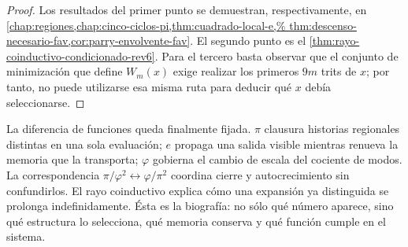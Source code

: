 \begin{proof}
Los resultados del primer punto se demuestran, respectivamente, en
\cref{chap:regiones,chap:cinco-ciclos-pi,thm:cuadrado-local-e,%
thm:descenso-necesario-fav,cor:parry-envolvente-fav}. El segundo punto es
el \cref{thm:rayo-coinductivo-condicionado-rev6}. Para el tercero basta
observar que el conjunto de minimización que define \(W_m(x)\) exige
realizar los primeros \(9m\) trits de \(x\); por tanto, no puede utilizarse
esa misma ruta para deducir qué \(x\) debía seleccionarse.
\end{proof}

La diferencia de funciones queda finalmente fijada. \(\pi\) clausura
historias regionales distintas en una sola evaluación; \(e\) propaga una
salida visible mientras renueva la memoria que la transporta; \(\varphi\)
gobierna el cambio de escala del cociente de modos. La correspondencia
\(\pi/\varphi^2\leftrightarrow\varphi/\pi^2\) coordina cierre y
autocrecimiento sin confundirlos. El rayo coinductivo explica cómo una
expansión ya distinguida se prolonga indefinidamente. Ésta es la biografía:
no sólo qué número aparece, sino qué estructura lo selecciona, qué memoria
conserva y qué función cumple en el sistema.
\fi
